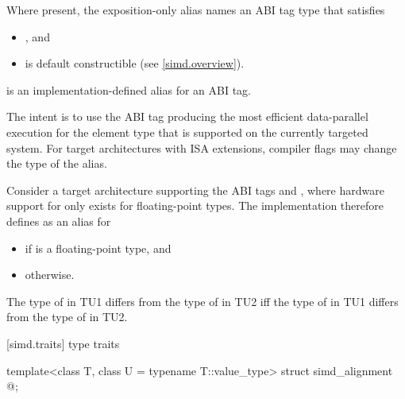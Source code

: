 \pnum
Where present, the exposition-only alias  names an ABI
tag type that satisfies
\begin{itemize}
  \item {}, and
  \item {} is default constructible (see \ref{simd.overview}).
\end{itemize}


\pnum
{} is an implementation-defined alias for an ABI tag.
\begin{note}
The intent is to use the ABI tag producing the most efficient data-parallel
execution for the element type  that is supported on the currently
targeted system.
For target architectures with ISA extensions, compiler flags may change the
type of the  alias.
\end{note}
\begin{example}
  Consider a target architecture supporting the ABI tags
   and , where hardware support for
   only exists for floating-point types.
  The implementation therefore defines  as an alias for
  \begin{itemize}
    \item {} if  is a floating-point type, and
    \item {} otherwise.
  \end{itemize}
\end{example}

\pnum
The type of  in TU1 differs from the type of
 in TU2 iff the type of  in TU1
differs from the type of  in TU2.

[simd.traits]{ type traits}

\begin{itemdecl}
template<class T, class U = typename T::value_type> struct simd_alignment { @\seebelow@ };
\end{itemdecl}

